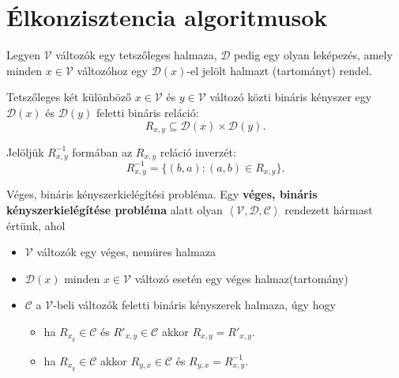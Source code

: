 \section{Élkonzisztencia algoritmusok}

\begin{definicio}
    Legyen $\mathcal{V}$ változók egy tetszőleges halmaza, $\mathcal{D}$ pedig
    egy olyan leképezés, amely minden $x \in \mathcal{V}$ változóhoz egy
    $\mathcal{D}(x)$-el jelölt halmazt (tartományt) rendel.

    Tetszőleges két különböző $x \in \mathcal{V}$ és $y \in \mathcal{V}$ változó
    közti bináris kényszer egy $\mathcal{D}(x)$ és $\mathcal{D}(y)$ feletti
    bináris reláció: \[
        R_{x,y} \subseteq  \mathcal{D}(x) \times \mathcal{D}(y)
    .\]

    Jelöljük $R^{-1}_{x,y}$ formában az $R_{x,y}$ reláció inverzét: \[
        R^{-1}_{x,y} = \{
            (b,a) : (a,b) \in R_{x,y}
        \}
    .\]
\end{definicio}

\begin{definicio}
    Véges, bináris kényszerkielégítési probléma.
    Egy {\bf véges, bináris kényszerkielégítése probléma} alatt olyan
    $\left<\mathcal{V}, \mathcal{D}, \mathcal{C} \right>$ rendezett hármast
    értünk, ahol
    \begin{itemize}
        \item $\mathcal{V}$ változók egy véges, nemüres halmaza
        \item $\mathcal{D}(x)$ minden $x \in \mathcal{V}$ változó esetén egy
            véges halmaz(tartomány)
        \item $\mathcal{C}$ a $\mathcal{V}$-beli változók feletti bináris
            kényszerek halmaza, úgy hogy
            \begin{itemize}
                \item ha $R_{x_y} \in \mathcal{C}$ és $R'_{x,y} \in
                    \mathcal{C}$ akkor $R_{x,y} = R'_{x,y}$.
                \item ha $R_{x_y} \in \mathcal{C}$ akkor $R_{y,x} \in
                    \mathcal{C}$ és $R_{y,x} = R^{-1}_{x,y}$.
            \end{itemize}
    \end{itemize}
\end{definicio}

